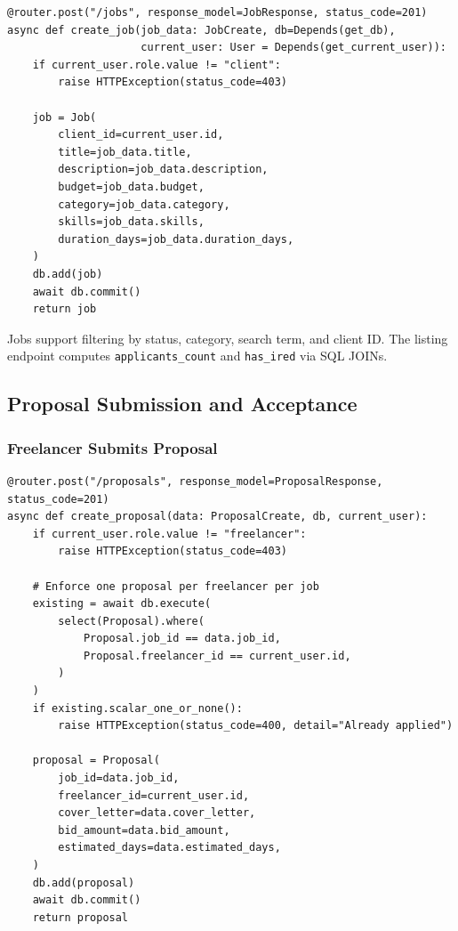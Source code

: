 \documentclass[12pt,a4paper]{article}
\begin{document}
\begin{lstlisting}[style=pythonstyle]
@router.post("/jobs", response_model=JobResponse, status_code=201)
async def create_job(job_data: JobCreate, db=Depends(get_db),
                     current_user: User = Depends(get_current_user)):
    if current_user.role.value != "client":
        raise HTTPException(status_code=403)

    job = Job(
        client_id=current_user.id,
        title=job_data.title,
        description=job_data.description,
        budget=job_data.budget,
        category=job_data.category,
        skills=job_data.skills,
        duration_days=job_data.duration_days,
    )
    db.add(job)
    await db.commit()
    return job
\end{lstlisting}

Jobs support filtering by status, category, search term, and client ID. The listing endpoint computes \texttt{applicants\_count} and \texttt{has\_ired} via SQL JOINs.

\subsection{Proposal Submission and Acceptance}

\subsubsection{Freelancer Submits Proposal}
\begin{lstlisting}[style=pythonstyle]
@router.post("/proposals", response_model=ProposalResponse, status_code=201)
async def create_proposal(data: ProposalCreate, db, current_user):
    if current_user.role.value != "freelancer":
        raise HTTPException(status_code=403)

    # Enforce one proposal per freelancer per job
    existing = await db.execute(
        select(Proposal).where(
            Proposal.job_id == data.job_id,
            Proposal.freelancer_id == current_user.id,
        )
    )
    if existing.scalar_one_or_none():
        raise HTTPException(status_code=400, detail="Already applied")

    proposal = Proposal(
        job_id=data.job_id,
        freelancer_id=current_user.id,
        cover_letter=data.cover_letter,
        bid_amount=data.bid_amount,
        estimated_days=data.estimated_days,
    )
    db.add(proposal)
    await db.commit()
    return proposal
\end{lstlisting}
\end{document}
